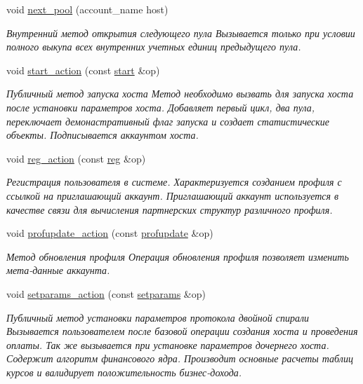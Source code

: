 \begin{DoxyCompactItemize}
void \mbox{\hyperlink{structeosio_1_1core_a7436c6f8e26b2cb9f73884616d3f4c64}{next\+\_\+pool}} (account\+\_\+name host)
\begin{DoxyCompactList}\small\item\em Внутренний метод открытия следующего пула Вызывается только при условии полного выкупа всех внутренних учетных единиц предыдущего пула. \end{DoxyCompactList}\item 
void \mbox{\hyperlink{structeosio_1_1core_a52b7bd0a4e7810a9911112c745f43fdb}{start\+\_\+action}} (const \mbox{\hyperlink{structeosio_1_1start}{start}} \&op)
\begin{DoxyCompactList}\small\item\em Публичный метод запуска хоста Метод необходимо вызвать для запуска хоста после установки параметров хоста. Добавляет первый цикл, два пула, переключает демонастративный флаг запуска и создает статистические объекты. Подписывается аккаунтом хоста. \end{DoxyCompactList}\item 
void \mbox{\hyperlink{structeosio_1_1core_ad6781ce293510a94cc421d386c9aae92}{reg\+\_\+action}} (const \mbox{\hyperlink{structeosio_1_1reg}{reg}} \&op)
\begin{DoxyCompactList}\small\item\em Регистрация пользователя в системе. Характеризуется созданием профиля с ссылкой на приглашающий аккаунт. Приглашающий аккаунт используется в качестве связи для вычисления партнерских структур различного профиля. \end{DoxyCompactList}\item 
void \mbox{\hyperlink{structeosio_1_1core_a1ce681caf15438f64bd6cef01c008079}{profupdate\+\_\+action}} (const \mbox{\hyperlink{structeosio_1_1profupdate}{profupdate}} \&op)
\begin{DoxyCompactList}\small\item\em Метод обновления профиля Операция обновления профиля позволяет изменить мета-\/данные аккаунта. \end{DoxyCompactList}\item 
void \mbox{\hyperlink{structeosio_1_1core_aeab146cbd52805b0e9689e32489d57d7}{setparams\+\_\+action}} (const \mbox{\hyperlink{structeosio_1_1setparams}{setparams}} \&op)
\begin{DoxyCompactList}\small\item\em Публичный метод установки параметров протокола двойной спирали Вызывается пользователем после базовой операции создания хоста и проведения оплаты. Так же вызывается при установке параметров дочернего хоста. Содержит алгоритм финансового ядра. Производит основные расчеты таблиц курсов и валидирует положительность бизнес-\/дохода. \end{DoxyCompactList}\item 

\end{DoxyCompactItemize}
